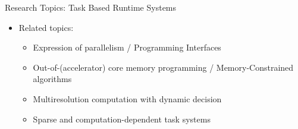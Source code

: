 \begin{frame}
\begin{overlayarea}{\linewidth}{0cm}
{\begin{center}
\begin{minipage}{.9\linewidth}
\begin{block}{Research Topics: Task Based Runtime Systems}
\begin{itemize}
                \begin{itemize}
                \item Networks with deep hierarchies / Manycore / NUMA / Accelerators
                \item Separation of concerns: going beyond MPI+X
                \item Management of asynchrony
                \item Overlap of computations and data movement
                \end{itemize}
            \item Related topics:
                \begin{itemize}
                \item Expression of parallelism / Programming Interfaces
                \item Out-of-(accelerator) core memory programming / Memory-Constrained algorithms
                \item Multiresolution computation with dynamic decision
                \item Sparse and computation-dependent task systems
                \end{itemize}
            \end{itemize}
          \end{block}
        \end{minipage}
      \end{center}
    }
  \end{overlayarea}

\end{frame} 
    

